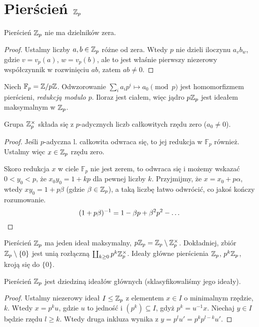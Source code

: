 \section{Pierścień $\mathbb Z_p$}
\begin{fakt}
	Pierścień  $\mathbb Z_p$ nie ma dzielników zera.
\end{fakt}

\begin{proof}
	Ustalmy liczby $a, b \in \mathbb Z_p$ różne od zera.
	Wtedy $p$ nie dzieli iloczynu $a_vb_w$, gdzie $v = v_p(a)$, $w = v_p(b)$, ale to jest właśnie pierwszy niezerowy współczynnik w rozwinięciu $ab$, zatem $ab \neq 0$.
\end{proof}

Niech  $\mathbb F_p = \mathbb Z / p\mathbb Z$. Odwzorowanie $\sum_i a_ip^i \mapsto a_0 \pmod p$ jest homomorfizmem pierścieni, \emph{redukcją modulo $p$}.
Iloraz jest ciałem, więc jądro $p\mathbb Z_p$ jest ideałem maksymalnym w $\mathbb Z_p$.

\begin{fakt}
	Grupa $\mathbb Z_p^\times$ składa się z $p$-adycznych liczb całkowitych rzędu zero ($a_0 \neq 0$).
\end{fakt}

\begin{proof}
	Jeśli $p$-adyczna l. całkowita odwraca się, to jej redukcja w $\mathbb F_p$ również.
	Ustalmy więc $x \in \mathbb Z_p$ rzędu zero.

	Skoro redukcja $x$ w ciele $\mathbb F_p$ nie jest zerem, to odwraca się i możemy wskazać $0 < y_0 < p$, że $x_0 y_0 =  1+  kp$ dla pewnej liczby $k$.
	Przyjmijmy, że $x = x_0 + p \alpha$, wtedy $xy_0 = 1 + p \beta$ (gdzie $\beta \in \mathbb Z_p$), a taką liczbę łatwo odwrócić, co jakoś kończy rozumowanie.
	\[
		(1+p\beta)^{-1} = 1 - \beta p + \beta^2p^2 - \ldots \qedhere
	\]
\end{proof}

Pierścień  $\mathbb Z_p$ ma jeden ideał maksymalny, $p \mathbb Z_p = \mathbb Z_p \setminus \mathbb Z_p^\times$.
Dokładniej, zbiór $\mathbb Z_p \setminus \{0\}$ jest unią rozłączną $\coprod_{k \ge 0} p^k \mathbb Z_p^\times$.
Ideały główne pierścienia $\mathbb Z_p$, $p^k \mathbb Z_p$, kroją się do $\{0\}$.

\begin{fakt}
	Pierścień $\mathbb Z_p$ jest dziedziną ideałów głównych (sklasyfikowaliśmy jego ideały).
\end{fakt}

\begin{proof}
	Ustalmy  niezerowy ideał $I \le \mathbb Z_p$ z elementem $x \in I$ o minimalnym rzędzie, $k$.
	Wtedy $x = p^k u$, gdzie $u$ to jedność i $(p^k) \subseteq I$, gdyż $p^k = u^{-1} x$.
	Niechaj $y \in I$ będzie rzędu $l \ge k$.
	Wtedy druga inkluza wynika z $y = p^l u' = p^k p^{l-k} u'$.
\end{proof}